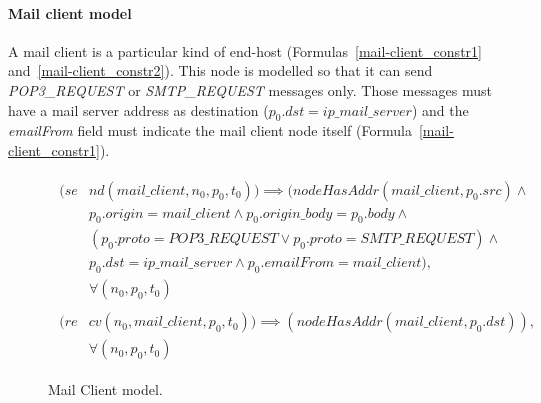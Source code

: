 \paragraph{Mail client model} A mail client is a particular kind of end-host (Formulas~\ref{mail-client_constr1} and~\ref{mail-client_constr2}). This node is modelled so that it can send \textit{POP3\_REQUEST} or \textit{SMTP\_REQUEST} messages only. Those messages must have a mail server address as destination (\textit{$p_{0}.dst = ip\_mail\_server$}) and the \textit{emailFrom} field must indicate the mail client node itself (Formula~\ref{mail-client_constr1}).
\begin{figure}[h]
	{\footnotesize
		\begin{subequations}
			\begin{align}
				\begin{split}
					\label{mail-client_constr1}
					(se& nd(mail\_client , n_{0}, p_{0}, t_{0})) \implies (nodeHasAddr(mail\_client, p_{0}.src) \wedge \\
					& p_{0}.origin = mail\_client \wedge p_{0}.origin\_body = p_{0}. body \wedge \\
					& (p_{0}.proto = POP3\_REQUEST \vee p_{0}.proto = SMTP\_REQUEST) \wedge \\
					& p_{0}.dst = ip\_mail\_server \wedge p_{0}.emailFrom = mail\_client), \\
					& \forall (n_{0}, p_{0}, t_{0})
				\end{split} \\
				\begin{split}
					\label{mail-client_constr2}
					(re& cv(n_{0}, mail\_client, p_{0}, t_{0})) \implies  (nodeHasAddr(mail\_client, p_{0}.dst)), \\
					& \forall (n_{0}, p_{0}, t_{0})
				\end{split}
			\end{align}
		\end{subequations}
	}%
	\caption{Mail Client model.}
	\label{mail-client_model}
\end{figure}

